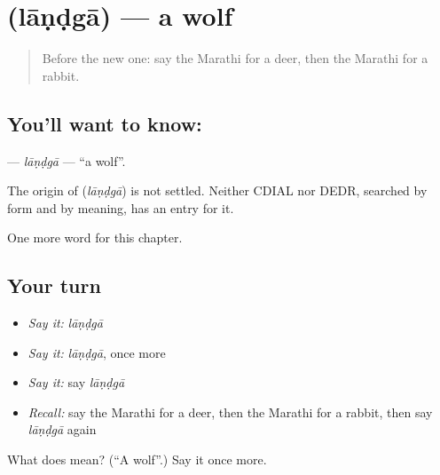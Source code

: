 \section[\texorpdfstring{\mr{लांडगा} (lāṇḍgā)}{लांडगा (lāṇḍgā)}]{ (lāṇḍgā) — a wolf}

\label{lesson:MR-C143-landga}



\begin{quote}
Before the new one: say the Marathi for a deer, then the Marathi for a rabbit.
\end{quote}

\subsection*{You'll want to know: }
\textbf{} — \emph{lāṇḍgā} — \textquotedblleft{}a wolf\textquotedblright{}.

\begin{cousinweb}
The origin of \textbf{} (\emph{lāṇḍgā}) is not settled. Neither CDIAL nor DEDR, searched by form and by meaning, has an entry for it.
\end{cousinweb}

\begin{grammarlens}[title={What you've built}]
One more word for this chapter.
\end{grammarlens}

\subsection*{Your turn}
\begin{itemize}
\raggedright
  \item \emph{Say it:} \emph{lāṇḍgā}
  \item \emph{Say it:} \emph{lāṇḍgā}, once more
  \item \emph{Say it:} say \emph{lāṇḍgā}
  \item \emph{Recall:} say the Marathi for a deer, then the Marathi for a rabbit, then say \emph{lāṇḍgā} again
\end{itemize}

\begin{tcolorbox}[breakable,colback=teal!4,colframe=teal!35!black,title={Before you move on}]
What does  mean? (\textquotedblleft{}A wolf\textquotedblright{}.) Say it once more.
\end{tcolorbox}
